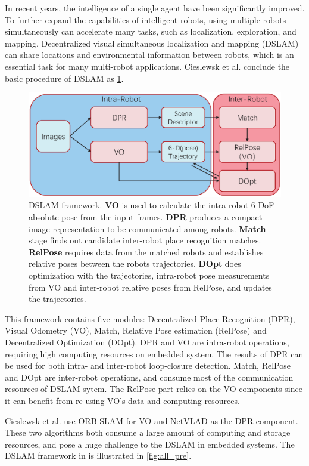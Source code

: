 \label{sec:introdutction}
In recent years, the intelligence of a single agent have been significantly improved. To further expand the capabilities of intelligent robots, using multiple robots simultaneously can accelerate many tasks, such as localization, exploration, and mapping.
Decentralized visual simultaneous localization and mapping (DSLAM) can share locations and environmental information between robots, which is an essential task for many multi-robot applications. Cieslewsk et al. \cite{Cieslewski:20187ee} conclude the basic procedure of DSLAM as \cref{fig:all}.

\begin{figure}[h]  
    \centering  
    \includegraphics[width=0.85\linewidth]{fig/all.eps}
    \caption{DSLAM framework. \textbf{VO} is used to calculate the intra-robot 6-DoF absolute pose from the input frames. \textbf{DPR} produces a compact image representation to be communicated among robots. \textbf{Match} stage finds out candidate inter-robot place recognition matches.  \textbf{RelPose} requires data from the matched robots and establishes relative poses between the robots trajectories. \textbf{DOpt} does optimization with the trajectories, intra-robot pose measurements from VO and inter-robot relative poses from RelPose, and updates the trajectories.}
    \label{fig:all}
\end{figure}

This framework contains five modules:  Decentralized  Place Recognition (DPR), Visual Odometry (VO), Match, Relative Pose estimation (RelPose) and Decentralized Optimization (DOpt). DPR and VO are intra-robot operations, requiring high computing resources on embedded system. The results of DPR can be used for both intra- and inter-robot loop-closure detection. Match, RelPose and DOpt are inter-robot operations, and consume most of the communication resources of DSLAM sytem. The RelPose part relies on the VO components since it can benefit from re-using VO's data and computing resources.

Cieslewsk et al. \cite{Cieslewski:20187ee} use ORB-SLAM \cite{Mur-Artal:2017281} for VO and NetVLAD \cite{Arandjelovic:2017997} as the DPR component. These two algorithms both consume a large amount of computing and storage resources, and pose a huge challenge to the DSLAM in embedded systems. The DSLAM framework in \cite{Cieslewski:20187ee} is illustrated in \cref{fig:all_pre}.


